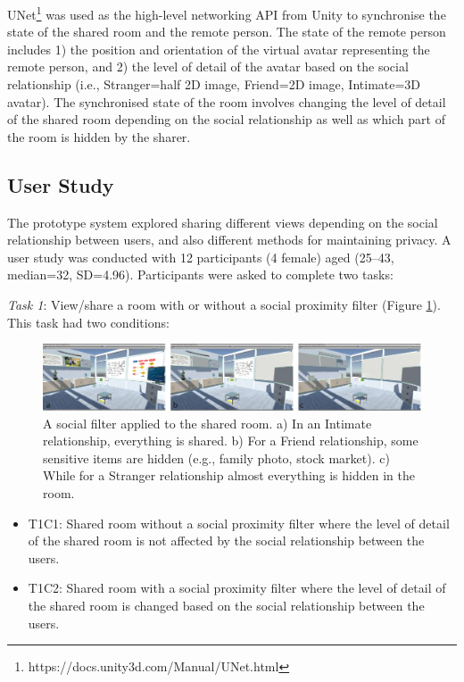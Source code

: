 UNet\footnote{https://docs.unity3d.com/Manual/UNet.html} was used as the high-level networking API from Unity to synchronise the state of the shared room and the remote person. The state of the remote person includes 1) the position and orientation of the virtual avatar representing the remote person, and 2) the level of detail of the avatar based on the social relationship (i.e., Stranger=half 2D image, Friend=2D image, Intimate=3D avatar). The synchronised state of the room involves changing the level of detail of the shared room depending on the social relationship as well as which part of the room is hidden by the sharer. 

\subsection{User Study}

The prototype system explored sharing different views depending on the social relationship between users, and also different methods for maintaining privacy. A user study was conducted with 12 participants (4 female) aged (25–43, median=32, SD=4.96). Participants were asked to complete two tasks: 

\textit{Task 1}: View/share a room with or without a social proximity filter (Figure \ref{fig:frontier18:social-filter}). This task had two conditions: 

\begin{figure}[H]
    \begin{center}
    \includegraphics[width=\linewidth]{images/frontier18/images-02.png}
    \caption{A social filter applied to the shared room. a) In an Intimate relationship, everything is shared. b) For a Friend relationship, some sensitive items are hidden (e.g., family photo, stock market). c) While for a Stranger relationship almost everything is hidden in the room.}\label{fig:frontier18:social-filter}
    \end{center}
\end{figure}

\begin{itemize}
    \item T1C1: Shared room without a social proximity filter where the level of detail of the shared room is not affected by the social relationship between the users.
    \item T1C2: Shared room with a social proximity filter where the level of detail of the shared room is changed based on the social relationship between the users. 
\end{itemize}

